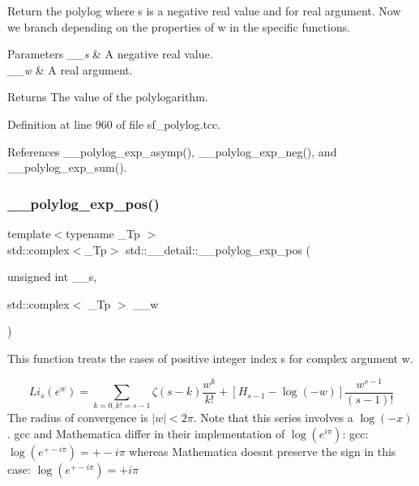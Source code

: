 Return the polylog where s is a negative real value and for real argument. Now we branch depending on the properties of w in the specific functions.


\begin{DoxyParams}{Parameters}
{\em \+\_\+\+\_\+s} & A negative real value. \\
\hline
{\em \+\_\+\+\_\+w} & A real argument. \\
\hline
\end{DoxyParams}
\begin{DoxyReturn}{Returns}
The value of the polylogarithm. 
\end{DoxyReturn}


Definition at line 960 of file sf\+\_\+polylog.\+tcc.



References \+\_\+\+\_\+polylog\+\_\+exp\+\_\+asymp(), \+\_\+\+\_\+polylog\+\_\+exp\+\_\+neg(), and \+\_\+\+\_\+polylog\+\_\+exp\+\_\+sum().

\mbox{\label{namespacestd_1_1____detail_a0327d2970eba3a0a2d73c71c7a77701c}} 
\subsubsection{\texorpdfstring{\+\_\+\+\_\+polylog\+\_\+exp\+\_\+pos()}{\_\_polylog\_exp\_pos()}\hspace{0.1cm}{\footnotesize\ttfamily [1/3]}}
{\footnotesize\ttfamily template$<$typename \+\_\+\+Tp $>$ \\
std\+::complex$<$\+\_\+\+Tp$>$ std\+::\+\_\+\+\_\+detail\+::\+\_\+\+\_\+polylog\+\_\+exp\+\_\+pos (\begin{DoxyParamCaption}\item[{unsigned int}]{\+\_\+\+\_\+s,  }\item[{std\+::complex$<$ \+\_\+\+Tp $>$}]{\+\_\+\+\_\+w }\end{DoxyParamCaption})}

This function treats the cases of positive integer index s for complex argument w.

\[ Li_s(e^w) = \sum_{k=0, k != s-1} \zeta(s-k) \frac{w^k}{k!} + \left[H_{s-1} - \log(-w)\right] \frac{w^{s-1}}{(s-1)!} \] The radius of convergence is $ |w| < 2 \pi $. Note that this series involves a $ \log(-x) $. gcc and Mathematica differ in their implementation of $ \log(e^{i\pi}) $\+: gcc\+: $ \log(e^{+-i\pi}) = +-i\pi $ whereas Mathematica doesn\textquotesingle{}t preserve the sign in this case\+: $ \log(e^{+- i\pi}) = +i \pi $


